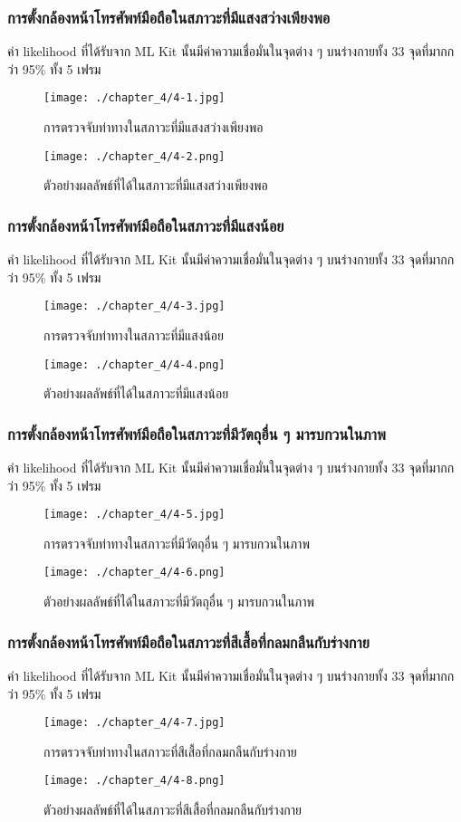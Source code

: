\subsubsection{การตั้งกล้องหน้าโทรศัพท์มือถือในสภาวะที่มีแสงสว่างเพียงพอ}
ค่า likelihood ที่ได้รับจาก ML Kit นั้นมีค่าความเชื่อมั่นในจุดต่าง ๆ บนร่างกายทั้ง 33 จุดที่มากกว่า 95\% ทั้ง 5 เฟรม
\begin{figure}
	\texttt{[image: ./chapter\_4/4-1.jpg]}
	\caption{การตรวจจับท่าทางในสภาวะที่มีแสงสว่างเพียงพอ}
\end{figure}
\begin{figure}
	\texttt{[image: ./chapter\_4/4-2.png]}
	\caption{ตัวอย่างผลลัพธ์ที่ได้ในสภาวะที่มีแสงสว่างเพียงพอ}
\end{figure}
\subsubsection{การตั้งกล้องหน้าโทรศัพท์มือถือในสภาวะที่มีแสงน้อย}
ค่า likelihood ที่ได้รับจาก ML Kit นั้นมีค่าความเชื่อมั่นในจุดต่าง ๆ บนร่างกายทั้ง 33 จุดที่มากกว่า 95\% ทั้ง 5 เฟรม
\begin{figure}
	\texttt{[image: ./chapter\_4/4-3.jpg]}
	\caption{การตรวจจับท่าทางในสภาวะที่มีแสงน้อย}
\end{figure}
\begin{figure}
	\texttt{[image: ./chapter\_4/4-4.png]}
	\caption{ตัวอย่างผลลัพธ์ที่ได้ในสภาวะที่มีแสงน้อย}
\end{figure}
\subsubsection{การตั้งกล้องหน้าโทรศัพท์มือถือในสภาวะที่มีวัตถุอื่น ๆ มารบกวนในภาพ}
ค่า likelihood ที่ได้รับจาก ML Kit นั้นมีค่าความเชื่อมั่นในจุดต่าง ๆ บนร่างกายทั้ง 33 จุดที่มากกว่า 95\% ทั้ง 5 เฟรม
\begin{figure}
	\texttt{[image: ./chapter\_4/4-5.jpg]}
	\caption{การตรวจจับท่าทางในสภาวะที่มีวัตถุอื่น ๆ มารบกวนในภาพ}
\end{figure}
\begin{figure}
	\texttt{[image: ./chapter\_4/4-6.png]}
	\caption{ตัวอย่างผลลัพธ์ที่ได้ในสภาวะที่มีวัตถุอื่น ๆ มารบกวนในภาพ}
\end{figure}
\subsubsection{การตั้งกล้องหน้าโทรศัพท์มือถือในสภาวะที่สีเสื้อที่กลมกลืนกับร่างกาย}
ค่า likelihood ที่ได้รับจาก ML Kit นั้นมีค่าความเชื่อมั่นในจุดต่าง ๆ บนร่างกายทั้ง 33 จุดที่มากกว่า 95\% ทั้ง 5 เฟรม
\begin{figure}
	\texttt{[image: ./chapter\_4/4-7.jpg]}
	\caption{การตรวจจับท่าทางในสภาวะที่สีเสื้อที่กลมกลืนกับร่างกาย}
\end{figure}
\begin{figure}
	\texttt{[image: ./chapter\_4/4-8.png]}
	\caption{ตัวอย่างผลลัพธ์ที่ได้ในสภาวะที่สีเสื้อที่กลมกลืนกับร่างกาย}
\end{figure}
